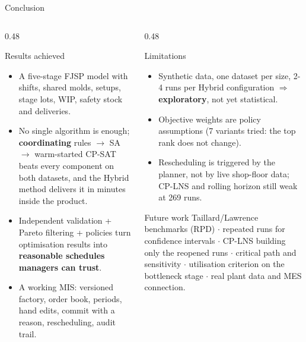 \begin{frame}{Conclusion}
\begin{columns}[T]
\begin{column}{0.48\textwidth}
\begin{exampleblock}{Results achieved}
\scriptsize
\begin{itemize}\setlength{\itemsep}{0.2em}
  \item A five-stage FJSP model with shifts, shared molds, setups, stage lots, WIP, safety stock and deliveries.
  \item No single algorithm is enough; \textbf{coordinating} rules $\to$ SA $\to$ warm-started CP-SAT beats every component
        on both datasets, and the Hybrid method delivers it in minutes inside the product.
  \item Independent validation + Pareto filtering + policies turn optimisation results into
        \textbf{reasonable schedules managers can trust}.
  \item A working MIS: versioned factory, order book, periods, hand edits, commit with a reason, rescheduling, audit trail.
\end{itemize}
\end{exampleblock}
\end{column}
\begin{column}{0.48\textwidth}
\begin{block}{Limitations}
\scriptsize
\begin{itemize}\setlength{\itemsep}{0.15em}
  \item Synthetic data, one dataset per size, 2-4 runs per Hybrid configuration $\Rightarrow$ \textbf{exploratory}, not yet statistical.
  \item Objective weights are policy assumptions (7 variants tried: the top rank does not change).
  \item Rescheduling is triggered by the planner, not by live shop-floor data; CP-LNS and rolling horizon still weak at 269 runs.
\end{itemize}
\end{block}
\vspace{-0.2em}
\begin{block}{Future work}
\scriptsize
Taillard/Lawrence benchmarks (RPD) $\cdot$ repeated runs for confidence intervals $\cdot$ CP-LNS building only the reopened runs $\cdot$
critical path and sensitivity $\cdot$ utilisation criterion on the bottleneck stage $\cdot$ real plant data and MES connection.
\end{block}
\end{column}
\end{columns}
\end{frame}

